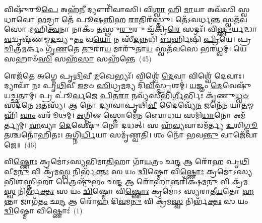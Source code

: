 𑌵𑌿𑌷𑍁᳴𑌰𑍂\-\ul{𑌪𑍇} 𑌅𑌹᳴\-\ul{𑌨𑍀} 𑌦𑍍𑌯𑍗𑌰𑌿᳴𑌵𑌾𑌸𑌿। 𑌵𑌿\-\ul{𑌶𑍍𑌵𑌾} 𑌹𑌿 \ul{𑌮𑌾}\-𑌯𑌾 𑌅𑌵᳴𑌸𑌿 𑌸𑍍𑌵𑌧𑌾𑌵𑍋 \ul{𑌭}\-𑌦𑍍𑌰𑌾 𑌤𑍇᳴ 𑌪𑍂𑌷\-\ul{𑌨𑍍𑌨𑌿}\-𑌹 \ul{𑌰𑌾}\-𑌤𑌿𑌰᳴𑌸𑍍𑌤𑍁। 𑌤𑍇᳴\-𑌽𑌵𑌰𑍍𑌧\-\ul{𑌨𑍍𑌤} 𑌸𑍍𑌵𑌤᳴𑌵𑌸𑍋 𑌮𑌹𑌿\-\ul{𑌤𑍍𑌵}\-𑌨𑌾 𑌨𑌾𑌕𑌂᳴ \ul{𑌤}\-𑌸𑍍𑌥𑍁\-\ul{𑌰𑍁}\-𑌰𑍁 𑌚᳴𑌕𑍍𑌰𑌿\-\ul{𑌰𑍇} 𑌸𑌦𑌃᳴। 𑌵𑌿\-\ul{𑌷𑍍𑌣𑍁}\-𑌰𑍍𑌯𑌦𑍍𑌧𑌾\-\ul{𑌵}\-𑌦𑍍𑌵𑍃𑌷᳴𑌣𑌮𑍍𑌮\-\ul{𑌦}\-𑌚𑍍𑌯𑍁\-\ul{𑌤𑌂} 𑌵\-\ul{𑌯𑍋} 𑌨 𑌸𑍀᳴\-\ul{𑌦}\-𑌨𑍍𑌨𑌧𑌿᳴ \ul{𑌬}\-𑌰𑍍\mbox{}𑌹𑌿𑌷𑌿᳴ \ul{𑌪𑍍𑌰𑌿}\-𑌯𑍇। 𑌪𑍍𑌰 \ul{𑌚𑌿}\-𑌤𑍍𑌰\-\ul{𑌮}\-𑌰𑍍𑌕𑌂 𑌗𑍃᳴\-\ul{𑌣}\-𑌤𑍇 \ul{𑌤𑍁}\-𑌰𑌾\-\ul{𑌯} 𑌮𑌾𑌰𑍁᳴𑌤𑌾\-\ul{𑌯} 𑌸𑍍𑌵𑌤᳴𑌵𑌸𑍇 𑌭𑌰𑌧𑍍𑌵𑌮𑍍। 𑌯𑍇 𑌸𑌹𑌾𑍞᳴\-\ul{𑌸𑌿} 𑌸𑌹᳴\-\ul{𑌸𑌾} 𑌸𑌹᳴𑌨𑍍𑌤𑍇~(45)

𑌰𑍇𑌜᳴𑌤𑍇 𑌅𑌗𑍍𑌨𑍇 𑌪𑍃\-\ul{𑌥𑌿}\-𑌵𑍀 \ul{𑌮}\-𑌖𑍇𑌭𑍍𑌯𑌃᳴। 𑌵𑌿𑌶𑍍𑌵𑍇᳴ \ul{𑌦𑍇}\-𑌵𑌾 𑌵𑌿𑌶𑍍𑌵𑍇᳴ 𑌦𑍇𑌵𑌾𑌃। 𑌦𑍍𑌯𑌾𑌵𑌾᳴ 𑌨𑌃 𑌪𑍃\-\ul{𑌥𑌿}\-𑌵𑍀 \ul{𑌇}\-𑌮𑍞 \ul{𑌸𑌿}\-𑌧𑍍𑌰\-\ul{𑌮}\-𑌦𑍍𑌯 𑌦𑌿᳴\-\ul{𑌵𑌿}\-𑌸𑍍𑌪𑍃𑌶𑌮𑍍॑। \ul{𑌯}\-𑌜𑍍𑌞𑌂 \ul{𑌦𑍇}\-𑌵𑍇𑌷𑍁᳴ 𑌯𑌚𑍍𑌛𑌤𑌾𑌮𑍍। 𑌪𑍍𑌰 𑌪𑍂॑\-\ul{𑌰𑍍𑌵}\-𑌜𑍇 \ul{𑌪𑌿}\-𑌤\-\ul{𑌰𑌾} 𑌨𑌵𑍍𑌯᳴𑌸𑍀𑌭𑌿\-\ul{𑌰𑍍𑌗𑍀}\-𑌰𑍍𑌭𑌿𑌃 𑌕𑍃᳴𑌣𑍁\-\ul{𑌧𑍍𑌵}\-\-\ul{𑍞} 𑌸𑌦᳴𑌨𑍇 \ul{𑌋}\-𑌤𑌸𑍍𑌯᳴। 𑌆 𑌨𑍋॑ 𑌦𑍍𑌯𑌾𑌵𑌾𑌪𑍃𑌥𑌿\-\ul{𑌵𑍀} 𑌦𑍈𑌵𑍍𑌯𑍇᳴\-\ul{𑌨} 𑌜𑌨𑍇᳴𑌨 𑌯𑌾\-\ul{𑌤}\-𑌮𑍍𑌮𑌹𑌿᳴ \ul{𑌵𑌾𑌂} 𑌵𑌰𑍂᳴𑌥𑌮𑍍। \ul{𑌅}\-𑌗𑍍𑌨𑌿𑍟 𑌸𑍍𑌤𑍋𑌮𑍇᳴𑌨 𑌬𑍋𑌧𑌯 𑌸𑌮𑌿\-\ul{𑌧𑌾}\-𑌨𑍋 𑌅𑌮᳴𑌰𑍍𑌤𑍍𑌯𑌮𑍍। \ul{𑌹}\-𑌵𑍍𑌯𑌾 \ul{𑌦𑍇}\-𑌵𑍇𑌷𑍁᳴ 𑌨𑍋 𑌦𑌧𑌤𑍍। 𑌸 𑌹᳴\-\ul{𑌵𑍍𑌯}\-𑌵𑌾𑌡𑌮᳴𑌰𑍍𑌤𑍍𑌯 \ul{𑌉}\-𑌶𑌿\-\ul{𑌗𑍍𑌦𑍂}\-𑌤𑌶𑍍𑌚𑌨𑍋᳴𑌹𑌿𑌤𑌃। \ul{𑌅}\-𑌗𑍍𑌨𑌿\-\ul{𑌰𑍍𑌧𑌿}\-𑌯𑌾 𑌸𑌮𑍃᳴𑌣𑍍𑌵𑌤𑌿। 𑌶𑌂 𑌨𑍋᳴ 𑌭𑌵\-\ul{𑌨𑍍𑌤𑍁} 𑌵𑌾𑌜𑍇᳴𑌵𑌾𑌜𑍇॥~(46)

{\anuvakamend[{\-\ul{𑌪𑍂}\-\-\ul{𑌰𑍁}\-\-\ul{𑌷}\-𑌤𑍍𑌵𑌤𑌾᳴ 𑌯\-\ul{𑌜}\-𑌤𑌨𑍍𑌤𑍇᳴ \ul{𑌅}\-𑌨𑍍𑌯𑌥𑍍𑌸𑌹᳴\-\ul{𑌨𑍍𑌤𑍇} 𑌚𑌨𑍋᳴𑌹𑌿\-\ul{𑌤𑍋}\-\-𑌽𑌷𑍍𑌟𑍗 𑌚᳴}]}%


{\anuvakamend[{𑌵𑌿\-\ul{𑌷𑍍𑌣𑍋𑌃} 𑌕𑍍𑌰𑌮𑍋᳴\-𑌽𑌸𑌿 \ul{𑌦𑌿}\-𑌵𑌸𑍍𑌪𑌰𑍍𑌯𑌨𑍍𑌨᳴\-\ul{𑌪}\-𑌤𑍇\-𑌽𑌪𑍇᳴\-\ul{𑌤} 𑌸𑌮𑌿᳴\-\ul{𑌤𑌂} 𑌯𑌾 \ul{𑌜𑌾}\-𑌤𑌾 𑌮𑌾 𑌨𑍋᳴ 𑌹𑌿𑍞𑌸𑍀\-\ul{𑌦𑍍𑌧𑍍𑌰𑍁}\-𑌵𑌾\-𑌽𑌸𑍍𑌯𑌾᳴\-\ul{𑌦𑌿}\-𑌤𑍍𑌯𑌙𑍍𑌗\-\ul{𑌰𑍍𑌭}\-𑌮𑌿𑌨𑍍𑌦𑍍𑌰𑌾॑𑌗𑍍𑌨𑍀 𑌰𑍋\-\ul{𑌚}\-𑌨𑍈𑌕𑌾᳴\-𑌦𑌶}]}%


\setcounter{anuvakam}{0}
𑌵𑌿\-\ul{𑌷𑍍𑌣𑍋𑌃} 𑌕𑍍𑌰𑌮𑍋॑\-𑌽𑌸𑍍𑌯𑌭𑌿𑌮𑌾\-\ul{𑌤𑌿}\-𑌹𑌾 𑌗𑌾᳴\-\ul{𑌯}\-𑌤𑍍𑌰𑌂 𑌛\-\ul{𑌨𑍍𑌦} 𑌆 𑌰𑍋᳴𑌹 𑌪𑍃\-\ul{𑌥𑌿}\-𑌵𑍀𑌮\-\ul{𑌨𑍁} 𑌵𑌿 𑌕𑍍𑌰᳴𑌮\-\ul{𑌸𑍍𑌵} 𑌨𑌿𑌰𑍍𑌭᳴\-\ul{𑌕𑍍𑌤𑌃} 𑌸 𑌯𑌂 \ul{𑌦𑍍𑌵𑌿}\-𑌷𑍍𑌮𑍋 𑌵𑌿\-\ul{𑌷𑍍𑌣𑍋𑌃} 𑌕𑍍𑌰𑌮𑍋॑\-𑌽𑌸𑍍𑌯𑌭𑌿𑌶\-\ul{𑌸𑍍𑌤𑌿}\-𑌹𑌾 𑌤𑍍𑌰𑍈𑌷𑍍𑌟𑍁᳴\-\ul{𑌭𑌂} 𑌛\-\ul{𑌨𑍍𑌦} 𑌆 𑌰𑍋᳴\-\ul{𑌹𑌾}\-𑌨𑍍𑌤𑌰𑌿᳴\-\ul{𑌕𑍍𑌷}\-𑌮\-\ul{𑌨𑍁} 𑌵𑌿 𑌕𑍍𑌰᳴𑌮\-\ul{𑌸𑍍𑌵} 𑌨𑌿𑌰𑍍𑌭᳴\-\ul{𑌕𑍍𑌤𑌃} 𑌸 𑌯𑌂 \ul{𑌦𑍍𑌵𑌿}\-𑌷𑍍𑌮𑍋 𑌵𑌿\-\ul{𑌷𑍍𑌣𑍋𑌃} 𑌕𑍍𑌰𑌮𑍋॑\-𑌽 𑌸𑍍𑌯𑌰𑌾𑌤𑍀\-\ul{𑌯}\-𑌤𑍋 \ul{𑌹}\-𑌨𑍍𑌤𑌾 𑌜𑌾𑌗᳴\-\ul{𑌤𑌂} 𑌛\-\ul{𑌨𑍍𑌦} 𑌆 𑌰𑍋᳴\-\ul{𑌹} 𑌦𑌿\-\ul{𑌵}\-𑌮\-\ul{𑌨𑍁} 𑌵𑌿 𑌕𑍍𑌰᳴𑌮\-\ul{𑌸𑍍𑌵} 𑌨𑌿𑌰𑍍𑌭᳴\-\ul{𑌕𑍍𑌤𑌃} 𑌸 𑌯𑌂 \ul{𑌦𑍍𑌵𑌿}\-𑌷𑍍𑌮𑍋 𑌵𑌿𑌷𑍍𑌣𑍋𑌃॑~(1)

